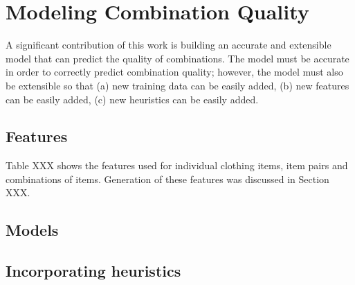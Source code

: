 \chapter{Modeling Combination Quality}

A significant contribution of this work is building an accurate and extensible
model that can predict the quality of combinations. The model must be accurate
in order to correctly predict combination quality; however, the model must also
be extensible so that (a) new training data can be easily added, (b) new
features can be easily added, (c) new heuristics can be easily added.

\section{Features}

Table XXX shows the features used for individual clothing items, item pairs and
combinations of items. Generation of these features was discussed in Section
XXX.

\section{Models}

\section{Incorporating heuristics}

